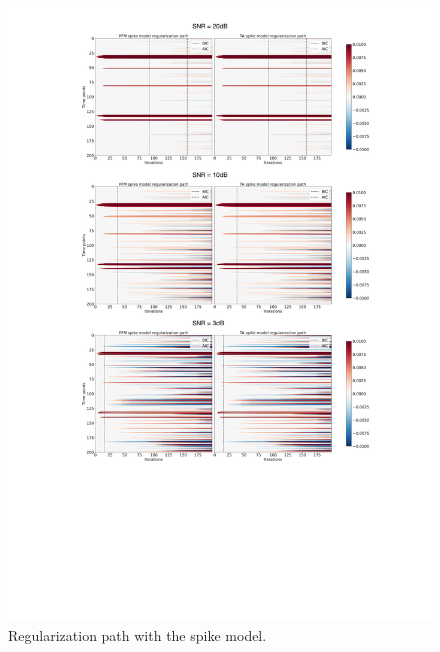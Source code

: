 \begin{figure}[t!]
    \begin{center}
        \includegraphics[]{figures/regpath_spike.pdf}
    \end{center}
    \caption{Regularization path with the spike model.}
\label{fig:path_spike}
\end{figure}

